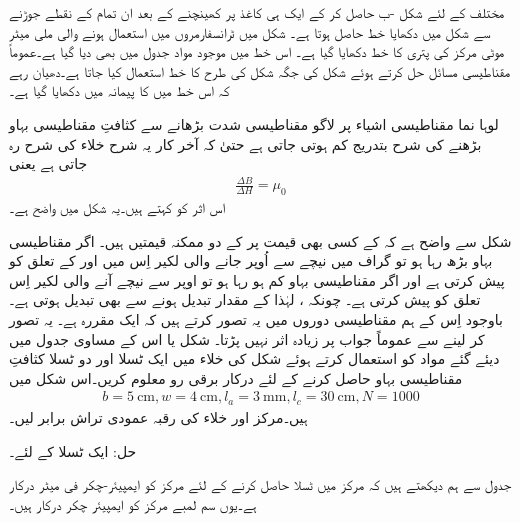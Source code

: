 مختلف  کے لئے  شکل -ب حاصل کر کے ایک ہی کاغذ پر کھینچنے کے بعد ان تمام کے   نقطے جوڑنے سے شکل  میں دکھایا  خط حاصل ہوتا ہے۔ شکل  میں ٹرانسفارمروں میں استعمال ہونے والی    ملی میٹر موٹی  مرکز کی پتری کا  خط دکھایا گیا ہے۔ اس خط میں موجود مواد جدول   میں بھی دیا گیا ہے۔عموماً مقناطیسی مسائل حل کرتے ہوئے شکل  کی جگہ شکل  کی طرح کا خط استعمال کیا جاتا ہے۔دھیان رہے کہ اس خط میں   کا پیمانہ  میں دکھایا گیا ہے۔

لوہا نما مقناطیسی اشیاء پر لاگو مقناطیسی شدت بڑھانے سے کثافتِ مقناطیسی بہاو بڑھنے کی شرح بتدریج کم ہوتی جاتی ہے حتیٰ کہ آخر کار یہ شرح خلاء کی شرح   رہ جاتی ہے یعنی
\begin{align}
\frac{\Delta B}{\Delta H}=\mu_0
\end{align}
اس اثر کو  کہتے ہیں۔یہ شکل   میں واضح ہے۔

شکل  سے واضح ہے کہ  کے کسی بھی قیمت پر  کے  دو ممکنہ قیمتیں ہیں۔ اگر مقناطیسی بہاو بڑھ رہا ہو تو گراف میں نیچے سے اُوپر جانے والی لکیر اِس میں  اور  کے تعلق کو پیش کرتی ہے اور اگر مقناطیسی بہاو کم ہو رہا ہو تو اوپر سے نیچے آنے والی لکیر اِس تعلق کو پیش کرتی ہے۔  چونکہ  ، لہٰذا  کے  مقدار تبدیل ہونے سے  بھی تبدیل ہوتی ہے۔ باوجود اِس کے ہم مقناطیسی دوروں میں یہ تصور کرتے ہیں کہ  ایک مقررہ ہے۔ یہ تصور کر لینے سے عموماً جواب پر زیادہ اثر نہیں پڑتا۔
%
شکل   یا اس کے مساوی جدول  میں دیئے گئے مواد کو استعمال کرتے ہوئے شکل   کی خلاء میں ایک ٹسلا اور دو ٹسلا کثافتِ  مقناطیسی بہاو حاصل کرنے کے لئے درکار برقی رو معلوم کریں۔اس شکل میں
\begin{align*}
b=\SI{5}{\centi\meter},w=\SI{4}{\centi\meter},l_a=\SI{3}{\milli\meter},l_c=\SI{30}{\centi\meter},N=1000
\end{align*}
ہیں۔مرکز اور خلاء کی رقبہ عمودی تراش برابر لیں۔

حل: ایک ٹسلا کے لئے۔

 جدول   سے ہم دیکھتے ہیں کہ مرکز میں  ٹسلا  حاصل کرنے کے لئے  مرکز کو   ایمپیئر-چکر فی  میٹر  درکار ہے۔یوں  سم لمبے مرکز کو   ایمپیئر چکر درکار ہیں۔

